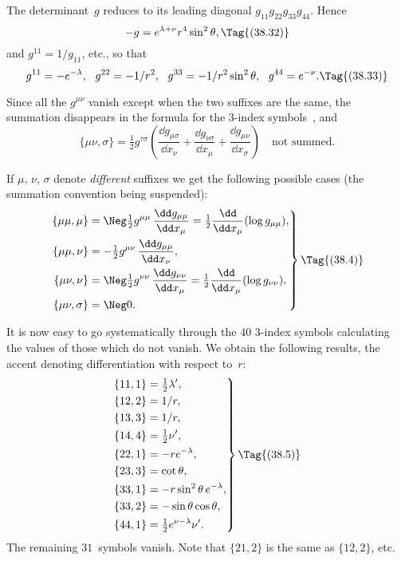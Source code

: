 \documentclass[12pt]{book}
\begin{document}
The determinant~$g$ reduces to its leading diagonal $g_{11} g_{22} g_{33} g_{44}$. Hence
\[
-g = e^{\lambda + \nu} r^{4} \sin^{2}\theta,
\Tag{(38.32)}
\]
and $g^{11} = 1/g_{11}$, etc., so that
\[
g^{11} = -e^{-\lambda},\ \
g^{22} = -1/r^{2},\ \
g^{33} = -1/r^{2} \sin^{2}\theta,\ \
g^{44} = e^{-\nu}.
\Tag{(38.33)}
\]

Since all the $g^{\mu\nu}$ vanish except when the two suffixes are the same, the
summation disappears in the formula for the $3$-index symbols~, and
\[
\{\mu\nu, \sigma\}
= \tfrac{1}{2} g^{\tau\sigma}\left(
  \frac{\dd g_{\mu\sigma}}{\dd x_{\nu}}
+ \frac{\dd g_{\nu\sigma}}{\dd x_{\mu}}
+ \frac{\dd g_{\mu\nu}}{\dd x_{\sigma}}
\right)\quad\text{not summed.}
\]

If $\mu$, $\nu$, $\sigma$ denote \emph{different} suffixes we get the following possible cases (the
summation convention being suspended):
\[
\left.
\begin{aligned}
  \{\mu\mu, \mu\}
  &= \Neg\tfrac{1}{2} g^{\mu\mu}\, \frac{\dd g_{\mu\mu}}{\dd x_{\mu}}
  = \tfrac{1}{2} \frac{\dd}{\dd x_{\mu}} (\log g_{\mu\mu}), \\
  \{\mu\mu, \nu\}
  &= -\tfrac{1}{2} g^{\mu\nu}\, \frac{\dd g_{\mu\mu}}{\dd x_{\nu}}, \\
  \{\mu\nu, \nu\}
  &= \Neg\tfrac{1}{2} g^{\nu\nu}\, \frac{\dd g_{\nu\nu}}{\dd x_{\mu}}
  = \tfrac{1}{2} \frac{\dd}{\dd x_{\mu}} (\log g_{\nu\nu}), \\
  \{\mu\nu, \sigma\}
  &= \Neg0.
\end{aligned}\right\}
\Tag{(38.4)}
\]

It is now easy to go systematically through the $40$ $3$-index symbols calculating
the values of those which do not vanish. We obtain the following
results, the accent denoting differentiation with respect to~$r$:
\[
\left.
\begin{aligned}
\{11, 1\} &= \tfrac{1}{2} \lambda', \\
\{12, 2\} &= 1/r, \\
\{13, 3\} &= 1/r, \\
\{14, 4\} &= \tfrac{1}{2} \nu', \\
\{22, 1\} &= -re^{-\lambda}, \\
\{23, 3\} &= \cot\theta, \\
\{33, 1\} &= -r\sin^{2}\theta\, e^{-\lambda}, \\
\{33, 2\} &= -\sin\theta \cos\theta, \\
\{44, 1\} &= \tfrac{1}{2} e^{\nu-\lambda} \nu'.
\end{aligned}
\right\}
\Tag{(38.5)}
\]
The remaining $31$~symbols vanish. Note that $\{21, 2\}$ is the same as $\{12, 2\}$, etc.
\end{document}
